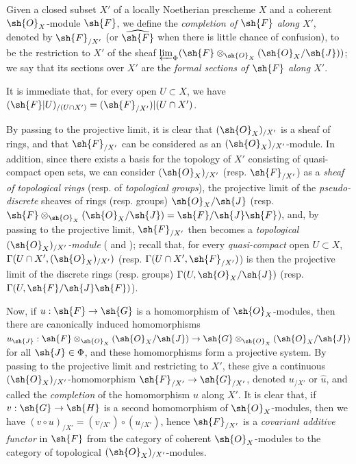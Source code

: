 \begin{definition}[10.8.4]
\label{I.10.8.4}
Given a closed subset $X'$ of a locally Noetherian prescheme $X$ and a coherent $\sh{O}_X$-module $\sh{F}$, we define the \emph{completion of $\sh{F}$ along $X'$}, denoted by $\sh{F}_{/X'}$ (or $\widehat{\sh{F}}$ when there is little chance of confusion), to be the restriction to $X'$ of the sheaf
$\varprojlim_\Phi(\sh{F}\otimes_{\sh{O}_X}(\sh{O}_X/\sh{J}))$; we say that its sections over $X'$ are the \emph{formal sections of $\sh{F}$ along $X'$}.
\end{definition}

It is immediate that, for every open $U\subset X$, we have $(\sh{F}|U)_{/(U\cap X')}=(\sh{F}_{/X'})|(U\cap X')$.

By passing to the projective limit, it is clear that $(\sh{O}_X)_{/X'}$ is a sheaf of rings, and that $\sh{F}_{/X'}$ can be considered as an $(\sh{O}_X)_{/X'}$-module.
In addition, since there exists a basis for the topology of $X'$ consisting of quasi-compact open sets, we can consider $(\sh{O}_X)_{/X'}$ (resp. $\sh{F}_{/X'}$) as a \emph{sheaf of topological rings} (resp. of \emph{topological groups}), the projective limit of the \emph{pseudo-discrete} sheaves of rings (resp. groups) $\sh{O}_X/\sh{J}$ (resp. $\sh{F}\otimes_{\sh{O}_X}(\sh{O}_X/\sh{J})=\sh{F}/\sh{J}\sh{F}$), and, by passing to the projective limit, $\sh{F}_{/X'}$ then becomes a \emph{topological $(\sh{O}_X)_{/X'}$-module} ( and ); recall that, for every \emph{quasi-compact} open $U\subset X$, $\Gamma(U\cap X',(\sh{O}_X)_{/X'})$ (resp. $\Gamma(U\cap X',\sh{F}_{/X'})$) is then the projective limit of the discrete rings (resp. groups) $\Gamma(U,\sh{O}_X/\sh{J})$ (resp. $\Gamma(U,\sh{F}/\sh{J}\sh{F})$).

Now, if $u:\sh{F}\to\sh{G}$ is a homomorphism of $\sh{O}_X$-modules, then there are canonically induced homomorphisms $u_\sh{J}:\sh{F}\otimes_{\sh{O}_X}(\sh{O}_X/\sh{J})\to\sh{G}\otimes_{\sh{O}_X}(\sh{O}_X/\sh{J})$ for all $\sh{J}\in\Phi$, and these homomorphisms form a projective system.
By passing to the projective limit and restricting to $X'$, these give a continuous $(\sh{O}_X)_{/X'}$-homomorphism $\sh{F}_{/X'}\to\sh{G}_{/X'}$, denoted $u_{/X'}$ or $\widehat{u}$, and called the \emph{completion} of the homomorphism $u$ along $X'$.
It is clear that, if $v:\sh{G}\to\sh{H}$ is a second homomorphism of $\sh{O}_X$-modules, then we have $(v\circ u)_{/X'}=(v_{/X'})\circ(u_{/X'})$, hence $\sh{F}_{/X'}$ is a \emph{covariant additive functor} in $\sh{F}$ from the category of coherent $\sh{O}_X$-modules to the category of topological $(\sh{O}_X)_{/X'}$-modules.

